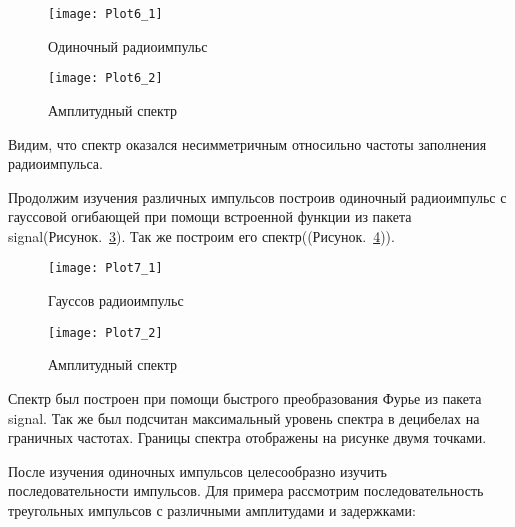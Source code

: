 \begin{figure}[H]
	\begin{center}
		\texttt{[image: Plot6\_1]}
		\caption{Одиночный радиоимпульс} 
		\label{pic:Plot6_1} %
	\end{center}
\end{figure}

\begin{figure}[H]
	\begin{center}
		\texttt{[image: Plot6\_2]}
		\caption{Амплитудный спектр} 
		\label{pic:Plot6_2} %
	\end{center}
\end{figure}

Видим, что спектр оказался несимметричным относильно частоты заполнения радиоимпульса.

Продолжим изучения различных импульсов построив одиночный радиоимпульс с гауссовой огибающей при помощи встроенной функции из пакета signal(Рисунок.~\ref{pic:Plot7_1}). Так же построим его спектр((Рисунок.~\ref{pic:Plot7_2})).



\parindent=1cm %

\begin{figure}[H]
	\begin{center}
		\texttt{[image: Plot7\_1]}
		\caption{Гауссов радиоимпульс} 
		\label{pic:Plot7_1} %
	\end{center}
\end{figure}

\begin{figure}[H]
	\begin{center}
		\texttt{[image: Plot7\_2]}
		\caption{Амплитудный спектр} 
		\label{pic:Plot7_2} %
	\end{center}
\end{figure}

Спектр был построен при помощи быстрого преобразования Фурье из пакета signal. Так же был подсчитан максимальный уровень спектра в децибелах на граничных частотах. Границы спектра отображены на рисунке двумя точками.

После изучения одиночных импульсов целесообразно изучить последовательности импульсов. Для примера рассмотрим последовательность треугольных импульсов с различными амплитудами и задержками:

